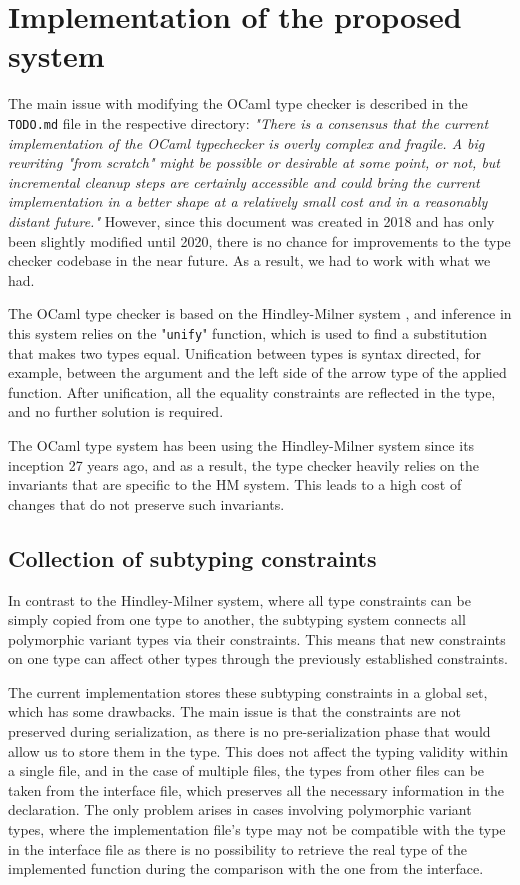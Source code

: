 \documentclass[a4paper,11pt,oneside]{article}
\theoremstyle{definition}
\begin{document}
\section{Implementation of the proposed system}

The main issue with modifying the OCaml type checker is described in the
\texttt{TODO.md} file in the respective directory:
{\itshape
"There is a consensus that the current implementation of the OCaml typechecker
is overly complex and fragile. A big rewriting "from scratch" might be possible
or desirable at some point, or not, but incremental cleanup steps are certainly
accessible and could bring the current implementation in a better shape at a
relatively small cost and in a reasonably distant future."
}
However, since this document was created in 2018 and has
only been slightly modified until 2020, there is no chance for improvements
to the type checker codebase in the near future. As a result, we had to work
with what we had.

The OCaml type checker is based on the Hindley-Milner system \cite{Hindley_1969}
\cite{Milner_1978}, and inference in this system relies on the "\texttt{unify}"
function, which is used to find a substitution that makes two types equal.
Unification between types is syntax directed, for example,
between the argument and the left side of the arrow type of the applied
function. After unification, all the equality constraints are reflected in
the type, and no further solution is required.

The OCaml type system has been using the Hindley-Milner system since its
inception 27 years ago, and as a result, the type checker heavily relies
on the invariants that are specific to the HM system. This leads to a high
cost of changes that do not preserve such invariants.

\subsection{Collection of subtyping constraints}

In contrast to the Hindley-Milner system, where all type constraints can
be simply copied from one type to another, the subtyping system connects
all polymorphic variant types via their constraints. This means that new
constraints on one type can affect other types through the previously
established constraints.

The current implementation stores these subtyping constraints in a global
set, which has some drawbacks. The main issue is that the constraints are
not preserved during serialization, as there is no pre-serialization phase
that would allow us to store them in the type. This does not affect the
typing validity within a single file, and in the case of multiple files,
the types from other files can be taken from the interface file, which
preserves all the necessary information in the declaration. The only problem
arises in cases involving polymorphic variant types, where the implementation
file's type may not be compatible with the type in the interface file as there
is no possibility to retrieve the real type of the implemented function during
the comparison with the one from the interface.
\end{document}
